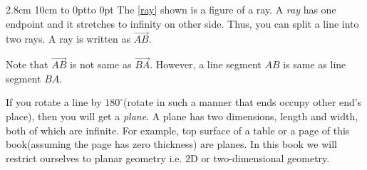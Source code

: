 2.8cm 10cm
\hbox to 0pt{\vbox to 0pt{%
\vss}\hss}
\indent The \ref{ray} shown is a figure of a ray. A {\it ray} has one endpoint and it stretches to infinity
on other side. Thus, you can split a line into two rays. A ray is written as $\overrightarrow{AB}$.\

Note that $\overrightarrow{AB}$ is not same as $\overrightarrow{BA}$. However, a line segment $AB$ is same as
line segment $BA$.

If you rotate a line by $180^\circ$(rotate in such a manner that ends occupy other end's place), then you
will get a {\it plane}. A plane has two dimensions, length and
width, both of which are infinite. For example, top surface of a table or a page of this book(assuming the
page has zero thickness) are planes. In this book we will restrict ourselves to planar geometry i.e. $2$D or
two-dimensional geometry.

